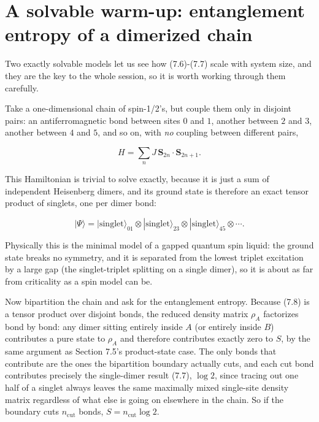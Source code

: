 \section{A solvable warm-up: entanglement entropy of a dimerized chain}

Two exactly solvable models let us see how (7.6)-(7.7) scale with system size, and they are the key to
the whole session, so it is worth working through them carefully.

Take a one-dimensional chain of spin-1/2's, but couple them only in disjoint pairs: an antiferromagnetic
bond between sites $0$ and $1$, another between $2$ and $3$, another between $4$ and $5$, and so on,
with \emph{no} coupling between different pairs,

\begin{equation*}
H = \sum_n J\,\mathbf{S}_{2n}\cdot\mathbf{S}_{2n+1}.
\end{equation*}

This Hamiltonian is trivial to solve exactly, because it is just a sum of independent Heisenberg
dimers, and its ground state is therefore an exact tensor product of singlets, one per dimer bond:

\begin{equation}
|\Psi\rangle = |\text{singlet}\rangle_{01} \otimes |\text{singlet}\rangle_{23} \otimes
|\text{singlet}\rangle_{45} \otimes \cdots.
\end{equation}

Physically this is the minimal model of a gapped quantum spin liquid: the ground state breaks no
symmetry, and it is separated from the lowest triplet excitation by a large gap (the singlet-triplet
splitting on a single dimer), so it is about as far from criticality as a spin model can be.

Now bipartition the chain and ask for the entanglement entropy. Because (7.8) is a tensor product over
disjoint bonds, the reduced density matrix $\rho_A$ factorizes bond by bond: any dimer sitting entirely
inside $A$ (or entirely inside $B$) contributes a pure state to $\rho_A$ and therefore contributes
exactly zero to $S$, by the same argument as Section 7.5's product-state case. The only bonds that
contribute are the ones the bipartition boundary actually cuts, and each cut bond contributes precisely
the single-dimer result (7.7), $\log 2$, since tracing out one half of a singlet always leaves the same
maximally mixed single-site density matrix regardless of what else is going on elsewhere in the chain.
So if the boundary cuts $n_\text{cut}$ bonds, $S = n_\text{cut} \log 2$.

